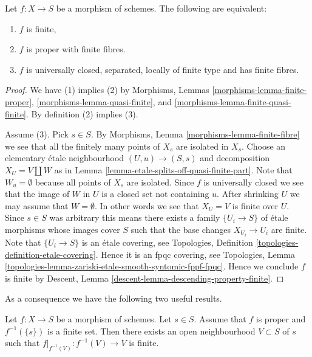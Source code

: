 \begin{lemma}
\label{lemma-characterize-finite}
Let $f : X \to S$ be a morphism of schemes.
The following are equivalent:
\begin{enumerate}
\item $f$ is finite,
\item $f$ is proper with finite fibres.
\item $f$ is universally closed, separated, locally of finite type
and has finite fibres.
\end{enumerate}
\end{lemma}

\begin{proof}
We have (1) implies (2) by
Morphisms, Lemmas \ref{morphisms-lemma-finite-proper},
\ref{morphisms-lemma-quasi-finite},
and \ref{morphisms-lemma-finite-quasi-finite}.
By definition (2) implies (3).

\medskip\noindent
Assume (3). Pick $s \in S$. By
Morphisms, Lemma \ref{morphisms-lemma-finite-fibre} we
see that all the finitely many points of $X_s$ are isolated in $X_s$.
Choose an elementary \'etale neighbourhood $(U, u) \to (S, s)$
and decomposition $X_U = V \coprod W$ as in
Lemma \ref{lemma-etale-splits-off-quasi-finite-part}.
Note that $W_u = \emptyset$ because all points of $X_s$ are isolated.
Since $f$ is universally closed we see that
the image of $W$ in $U$ is a closed set not containing $u$.
After shrinking $U$ we may assume that $W = \emptyset$.
In other words we see that $X_U = V$ is finite over $U$.
Since $s \in S$ was arbitrary
this means there exists a family $\{U_i \to S\}$
of \'etale morphisms whose images cover $S$ such that
the base changes $X_{U_i} \to U_i$ are finite.
Note that $\{U_i \to S\}$ is an \'etale covering,
see Topologies, Definition \ref{topologies-definition-etale-covering}.
Hence it is an fpqc covering, see
Topologies,
Lemma \ref{topologies-lemma-zariski-etale-smooth-syntomic-fppf-fpqc}.
Hence we conclude $f$ is finite by
Descent, Lemma \ref{descent-lemma-descending-property-finite}.
\end{proof}

\noindent
As a consequence we have the following two useful results.

\begin{lemma}
\label{lemma-proper-finite-fibre-finite-in-neighbourhood}
Let $f : X \to S$ be a morphism of schemes.
Let $s \in S$.
Assume that $f$ is proper and $f^{-1}(\{s\})$ is a finite set.
Then there exists an open neighbourhood $V \subset S$ of $s$
such that $f|_{f^{-1}(V)} : f^{-1}(V) \to V$ is finite.
\end{lemma}

